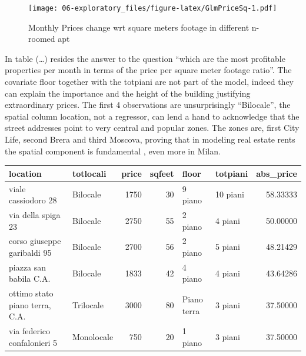 \documentclass[
  12pt,
  a4paper,
  oneside]{book}
\theoremstyle{definition}
\theoremstyle{definition}
\theoremstyle{definition}
\theoremstyle{remark}
\begin{document}
\begin{figure}
\centering
\texttt{[image: 06-exploratory\_files/figure-latex/GlmPriceSq-1.pdf]}
\caption{\label{fig:GlmPriceSq}Monthly Prices change wrt square meters footage in different n-roomed apt}
\end{figure}

In table (\ldots) resides the answer to the question ``which are the most profitable properties per month in terms of the price per square meter footage ratio''. The covariate floor together with the totpiani are not part of the model, indeed they can explain the importance and the height of the building justifying extraordinary prices. The first 4 observations are unsurprisingly ``Bilocale'', the spatial column location, not a regressor, can lend a hand to acknowledge that the street addresses point to very central and popular zones. The zones are, first City Life, second Brera and third Moscova, proving that in modeling real estate rents the spatial component is fundamental , even more in Milan.

\begin{tabular}{llrrllr}
\toprule
location & totlocali & price & sqfeet & floor & totpiani & abs\_price\\
\midrule
viale cassiodoro 28 & Bilocale & 1750 & 30 & 9 piano & 10 piani & 58.33333\\
via della spiga 23 & Bilocale & 2750 & 55 & 2 piano & 4 piani & 50.00000\\
corso giuseppe garibaldi 95 & Bilocale & 2700 & 56 & 2 piano & 5 piani & 48.21429\\
piazza san babila C.A. & Bilocale & 1833 & 42 & 4 piano & 4 piani & 43.64286\\
ottimo stato piano terra, C.A. & Trilocale & 3000 & 80 & Piano terra & 3 piani & 37.50000\\
\addlinespace
via federico confalonieri 5 & Monolocale & 750 & 20 & 1 piano & 3 piani & 37.50000\\
\bottomrule
\end{tabular}
\end{document}
